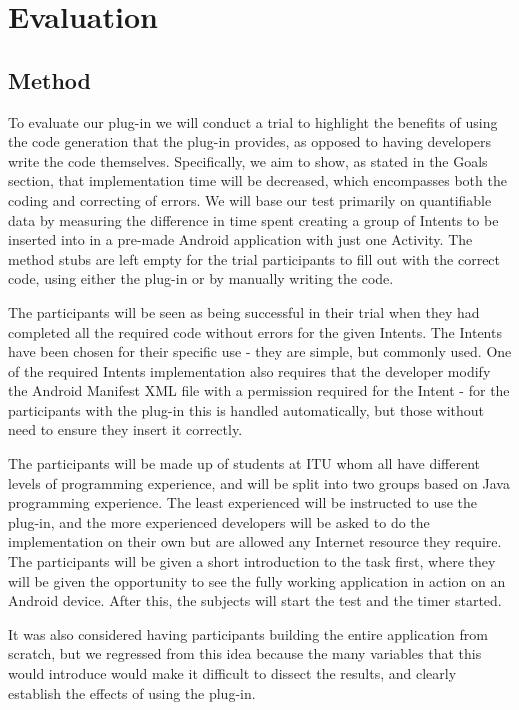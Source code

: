 \section{Evaluation}
\label{evaluation}

\subsection{Method}
\label{Method}
To evaluate our plug-in we will conduct a trial to highlight the benefits of using the code generation that the plug-in provides, as opposed to having developers write the code themselves. Specifically, we aim to show, as stated in the Goals section, that implementation time will be decreased, which encompasses both the coding and correcting of errors. We will base our test primarily on quantifiable data by measuring the difference in time spent creating a group of Intents to be inserted into in a pre-made Android application with just one Activity. The method stubs are left empty for the trial participants to fill out with the correct code, using either the plug-in or by manually writing the code.

The participants will be seen as being successful in their trial when they had completed all the required code without errors for the given Intents. The Intents have been chosen for their specific use - they are simple, but commonly used. One of the required Intents implementation also requires that the developer modify the Android Manifest XML file with a permission required for the Intent - for the participants with the plug-in this is handled automatically, but those without need to ensure they insert it correctly.

The participants will be made up of students at ITU whom all have different levels of programming experience, and will be split into two groups based on Java programming experience. The least experienced will be instructed to use the plug-in, and the more experienced developers will be asked to do the implementation on their own but are allowed any Internet resource they require. The participants will be given a short introduction to the task first, where they will be given the opportunity to see the fully working application in action on an Android device. After this, the subjects will start the test and the timer started.

It was also considered having participants building the entire application from scratch, but we regressed from this idea because the many variables that this would introduce would make it difficult to dissect the results, and clearly establish the effects of using the plug-in.

